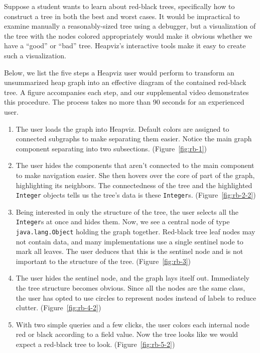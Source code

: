Suppose a student wants to learn about red-black trees, specifically how
to construct a tree in both the best and worst cases.  It would be 
impractical to examine manually a reasonably-sized tree using a debugger, 
but a visualization of the tree with the nodes colored appropriately would 
make it obvious whether we have a ``good'' or ``bad'' tree. Heapviz's 
interactive tools make it easy to create such a visualization.

Below, we list the five steps a Heapviz user would perform
to transform an unsummarized heap graph into an effective diagram of the 
contained red-black tree. A figure accompanies each step, and our 
supplemental video demonstrates this procedure.  The process takes no more 
than 90 seconds for an experienced user.

\begin{enumerate}

\item The user loads the graph into Heapviz. Default colors are assigned 
to connected subgraphs to make separating them easier. Notice the main 
graph component separating into two subsections. (Figure~\ref{fig:rb-1})

\item The user hides the components that aren't connected to the main component
to make navigation easier. She then hovers over the 
core of part of the graph, highlighting its neighbors. The connectedness 
of the tree and the highlighted \texttt{Integer} objects
tells us the tree's data is these \texttt{Integer}s. (Figure~\ref{fig:rb-2-2})

\item Being interested in only the structure of the tree, the user selects 
all the \texttt{Integer}s at once and hides them. Now, we see a central 
node of type \texttt{java.lang.Object} holding the graph together. 
Red-black tree leaf nodes may not contain 
data, and many implementations use a single sentinel node to mark all leaves.
The user deduces that this is the sentinel node and is not important
to the structure of the tree. (Figure~\ref{fig:rb-3})

\item The user hides the sentinel node, and the graph lays itself out.
Immediately the tree structure becomes obvious. Since all the nodes are 
the same class, the user has opted to use circles to represent nodes 
instead of labels to reduce clutter. (Figure~\ref{fig:rb-4-2})

\item With two simple queries and a few clicks, the user colors each 
internal node red or black according to a field value. Now the tree
looks like we would expect a red-black tree to look.
(Figure~\ref{fig:rb-5-2})

\end{enumerate}

